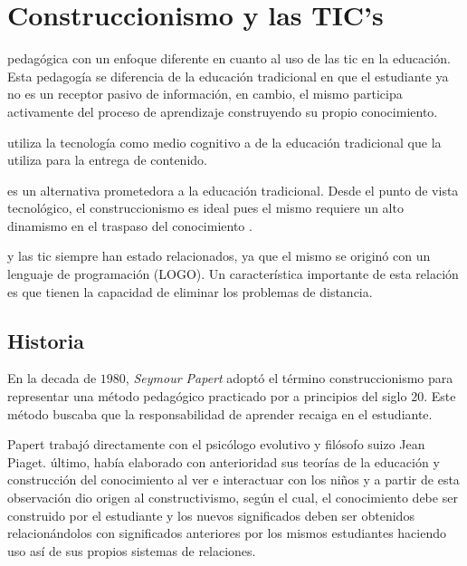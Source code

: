 \section{Construccionismo y las TIC's}
\label{sec:tics_CONSTRUCCIONISMO}

 pedagógica con un enfoque diferente en cuanto al uso de las
\Gls{tic} en la educación. Esta pedagogía se diferencia de la educación
tradicional en que el estudiante ya no es un receptor pasivo de información, en
cambio, el mismo participa activamente del proceso de aprendizaje construyendo
su propio conocimiento. 

 utiliza la tecnología como medio
cognitivo  a  de la educación tradicional que la utiliza para la
entrega de contenido. 

 es un alternativa prometedora a la
educación tradicional. Desde el punto de vista tecnológico, el construccionismo
es ideal pues el mismo requiere un alto dinamismo en el traspaso del
conocimiento \cite{sasha:construtivism}. 

 y las \Gls{tic} siempre han estado
relacionados, ya que el mismo se originó con un lenguaje de programación
(LOGO)\cite{ict:ttc}. Un característica importante de esta relación es que
tienen la capacidad de eliminar los problemas de
distancia\cite{mariluz:seiousgames}.


\subsection{Historia}

En la decada de $1980$, \emph{Seymour Papert} adoptó el término construccionismo
para representar una método pedagógico practicado por  a
principios del siglo 20. Este método buscaba que la responsabilidad de aprender
recaiga en el estudiante. 

Papert trabajó directamente con el psicólogo evolutivo y filósofo suizo Jean
Piaget.  último, había elaborado con anterioridad sus teorías
de la educación y construcción del conocimiento al ver e interactuar con los
niños y a partir de esta observación dio origen al constructivismo, según el
cual, el conocimiento debe ser construido por el estudiante y los nuevos
significados deben ser obtenidos relacionándolos con significados anteriores por
los mismos estudiantes haciendo uso así de sus propios sistemas de relaciones.

